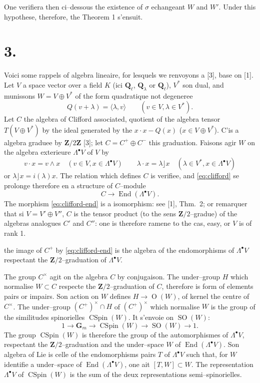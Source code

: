 \documentclass[11pt,a4paper]{article}
\theoremstyle{plain}
\theoremstyle{definition}
\DeclareMathOperator{\End}{End}
\DeclareMathOperator{\CSpin}{CSpin}
\DeclareMathOperator{\SO}{SO}
\DeclareMathOperator{\Ogrp}{O}
\begin{document}
One verifiera then ci--dessous the existence of $\sigma$ echangeant $W$ and $W'$. Under this hypothese, therefore, the Theorem 1 s'ensuit.

\section*{3.}

Voici some rappels of algebra lineaire, for lesquels we renvoyons a [3], base on [1]. Let $V$ a space vector over a field $K$ (ici $\mathbf{Q}_\ell$, $\mathbf{Q}_\lambda$ or $\mathbf{Q}_\ell$), $V^*$ son dual, and munissons $W = V \oplus V^*$ of the form quadratique not degeneree
\[
Q(v + \lambda) = \langle \lambda, v \rangle \qquad (v \in V, \lambda \in V^*) .
\]
Let $C$ the algebra of Clifford associated, quotient of the algebra tensor $T(V \oplus V^*)$ by the ideal generated by the $x \cdot x - Q(x)$ ($x \in V \oplus V^*$). C'is a algebra graduee by $\mathbf{Z}/2\mathbf{Z}$ [3]; let $C = C^+ \oplus C^-$ this graduation. Faisons agir $W$ on the algebra exterieure $\Lambda^\bullet V$ of $V$ by
\begin{equation}\label{eq:clifford}
v \cdot x = v \wedge x \quad (v \in V, x \in \Lambda^\bullet V) \qquad
\lambda \cdot x = \lambda \rfloor x \quad (\lambda \in V^*, x \in \Lambda^\bullet V)
\end{equation}
or $\lambda \rfloor x = i(\lambda)x$. The relation which defines $C$ is verifiee, and \eqref{eq:clifford} se prolonge therefore en a structure of $C$--module
\begin{equation}\label{eq:clifford-end}
C \longrightarrow \End(\Lambda^\bullet V) .
\end{equation}
The morphism \eqref{eq:clifford-end} is a isomorphism: see [1], Thm.~2; or remarquer that si $V = V' \oplus V''$, $C$ is the tensor product (to the sens $\mathbf{Z}/2$--gradue) of the algebras analogues $C'$ and $C''$: one is therefore ramene to the cas, easy, or $V$ is of rank 1.

the image of $C^+$ by \eqref{eq:clifford-end} is the algebra of the endomorphisms of $\Lambda^\bullet V$ respectant the $\mathbf{Z}/2$--graduation of $\Lambda^\bullet V$.

The group $C^\times$ agit on the algebra $C$ by conjugaison. The under--group $H$ which normalise $W \subset C$ respecte the $\mathbf{Z}/2$--graduation of $C$, therefore is form of elements pairs or impairs. Son action on $W$ defines $H \to \Ogrp(W)$, of kernel the centre of $C^\times$. The under--group $(C^+)^\times \cap H$ of $(C^+)^\times$ which normalise $W$ is the group of the similitudes spinorielles $\CSpin(W)$. It s'envoie on $\SO(W)$:
\[
1 \longrightarrow \mathbf{G}_m \longrightarrow \CSpin(W) \longrightarrow \SO(W) \longrightarrow 1 .
\]
The group $\CSpin(W)$ is therefore the group of the automorphismes of $\Lambda^\bullet V$, respectant the $\mathbf{Z}/2$--graduation and the under--space $W$ of $\End(\Lambda^\bullet V)$. Son algebra of Lie is celle of the endomorphisms pairs $T$ of $\Lambda^\bullet V$ such that, for $W$ identifie a under--space of $\End(\Lambda^\bullet V)$, one ait $[T, W] \subset W$. The representation $\Lambda^\bullet V$ of $\CSpin(W)$ is the sum of the deux representations semi--spinorielles.
\end{document}

